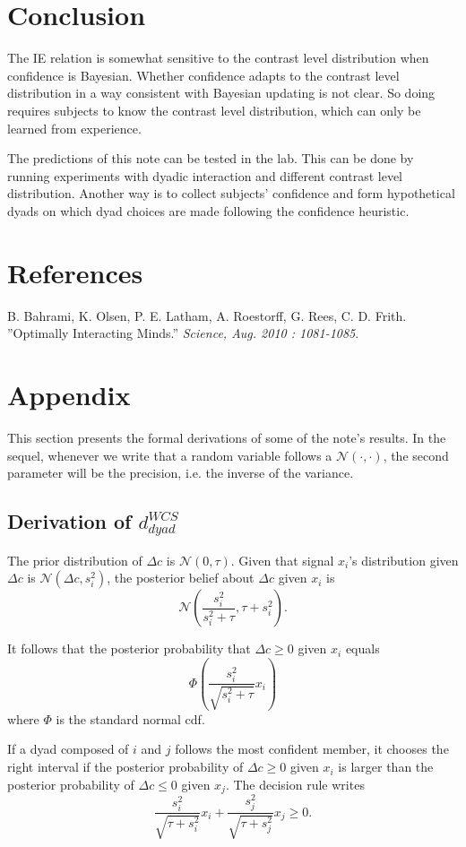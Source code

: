 \documentclass[12pt]{article}
\begin{document}
\section{Conclusion}

The IE relation is somewhat sensitive to the contrast level distribution when confidence is Bayesian. Whether confidence adapts to the contrast level distribution in a way consistent with Bayesian updating is not clear. So doing requires subjects to know the contrast level distribution, which can only be learned from experience. 

The predictions of this note can be tested in the lab. This can be done by running experiments with dyadic interaction and different contrast level distribution. Another way is to collect subjects' confidence and form hypothetical dyads on which dyad choices are made following the confidence heuristic. 

\section*{References}
B. Bahrami, K. Olsen, P. E. Latham, A. Roestorff, G. Rees, C. D. Frith. ''Optimally Interacting Minds.'' \textit{Science, Aug. 2010 : 1081-1085}.

\section*{Appendix}
This section presents the formal derivations of some of the note's results. In the sequel, whenever we write that a random variable follows a $\mathcal{N}(\cdot,\cdot)$, the second parameter will be the precision, i.e. the inverse of the variance. 

\subsection*{Derivation of $d_{dyad}^{WCS}$}
The prior distribution of $\Delta c$ is $\mathcal{N}(0,\tau)$. Given that signal $x_i$'s distribution given $\Delta c$ is $\mathcal{N}(\Delta c, s_i^2)$, the posterior belief about $\Delta c$ given $x_i$ is $$\mathcal{N}(\frac{s_i^2}{s_i^2+\tau}, \tau + s_i^2).$$ 

It follows that the posterior probability that $\Delta c \geq 0$ given $x_i$ equals $$\Phi(\frac{s_i^2}{\sqrt{s_i^2+\tau}} x_i)$$ where $\Phi$ is the standard normal cdf.

If a dyad composed of $i$ and $j$ follows the most confident member, it chooses the right interval if the posterior probability of $\Delta c \geq 0$ given $x_i$ is larger than the posterior probability of $\Delta c \leq 0$ given $x_j$. The decision rule writes $$ \frac{s_i^2}{\sqrt{\tau+s_i^2}} x_i + \frac{s_j^2}{\sqrt{\tau+s_j^2}} x_j \geq 0 .$$
\end{document}

